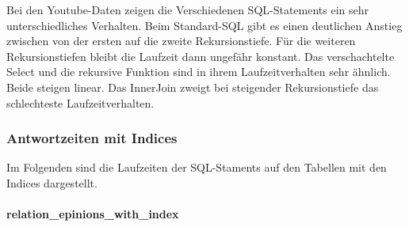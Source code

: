 Bei den Youtube-Daten zeigen die Verschiedenen SQL-Statements ein sehr unterschiedliches Verhalten. Beim Standard-SQL gibt es einen deutlichen Anstieg zwischen von der ersten auf die zweite Rekursionstiefe. Für die weiteren Rekursionstiefen bleibt die Laufzeit dann ungefähr konstant. Das verschachtelte Select und die rekursive Funktion sind in ihrem Laufzeitverhalten sehr ähnlich. Beide steigen linear. Das InnerJoin zweigt bei steigender Rekursionstiefe das schlechteste Laufzeitverhalten.

\subsubsection{Antwortzeiten mit Indices}

Im Folgenden sind die Laufzeiten der SQL-Staments auf den Tabellen mit den Indices dargestellt.

\paragraph{relation\_epinions\_with\_index}\mbox{}\\

